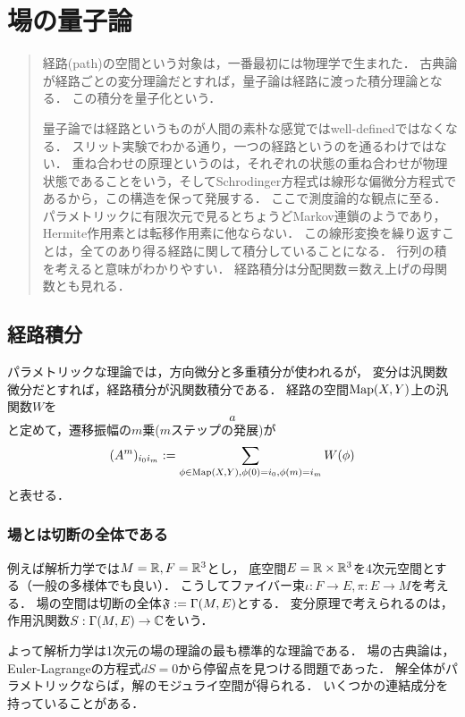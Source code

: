 \documentclass[uplatex,dvipdfmx]{jsreport}
\begin{document}
\chapter{場の量子論}

\begin{quotation}
    経路(path)の空間という対象は，一番最初には物理学で生まれた．
    古典論が経路ごとの変分理論だとすれば，量子論は経路に渡った積分理論となる．
    この積分を量子化という．

    量子論では経路というものが人間の素朴な感覚ではwell-definedではなくなる．
    スリット実験でわかる通り，一つの経路というのを通るわけではない．
    重ね合わせの原理というのは，それぞれの状態の重ね合わせが物理状態であることをいう，そしてSchrodinger方程式は線形な偏微分方程式であるから，この構造を保って発展する．
    ここで測度論的な観点に至る．
    パラメトリックに有限次元で見るとちょうどMarkov連鎖のようであり，Hermite作用素とは転移作用素に他ならない．
    この線形変換を繰り返すことは，全てのあり得る経路に関して積分していることになる．
    行列の積を考えると意味がわかりやすい．
    経路積分は分配関数＝数え上げの母関数とも見れる．
\end{quotation}

\section{経路積分}

パラメトリックな理論では，方向微分と多重積分が使われるが，
変分は汎関数微分だとすれば，経路積分が汎関数積分である．
経路の空間$\mathrm{Map}(X,Y)$上の汎関数$W$を
\[a\]
と定めて，遷移振幅の$m$乗($m$ステップの発展)が
\[(A^m)_{i_0i_m}:=\sum_{\phi\in\mathrm{Map}(X,Y),\phi(0)=i_0,\phi(m)=i_m}W(\phi)\]
と表せる．

\subsection{場とは切断の全体である}

例えば解析力学では$M=\mathbb{R},F=\mathbb{R}^3$とし，
底空間$E=\mathbb{R}\times\mathbb{R}^3$を4次元空間とする（一般の多様体でも良い）．
こうしてファイバー束$\iota:F\to E,\pi:E\to M$を考える．
場の空間は切断の全体$\mathfrak{F}:=\Gamma(M,E)$とする．
変分原理で考えられるのは，作用汎関数$S:\Gamma(M,E)\to\mathbb{C}$をいう．

よって解析力学は1次元の場の理論の最も標準的な理論である．
場の古典論は，Euler-Lagrangeの方程式$dS=0$から停留点を見つける問題であった．
解全体がパラメトリックならば，解のモジュライ空間が得られる．
いくつかの連結成分を持っていることがある．
\end{document}
